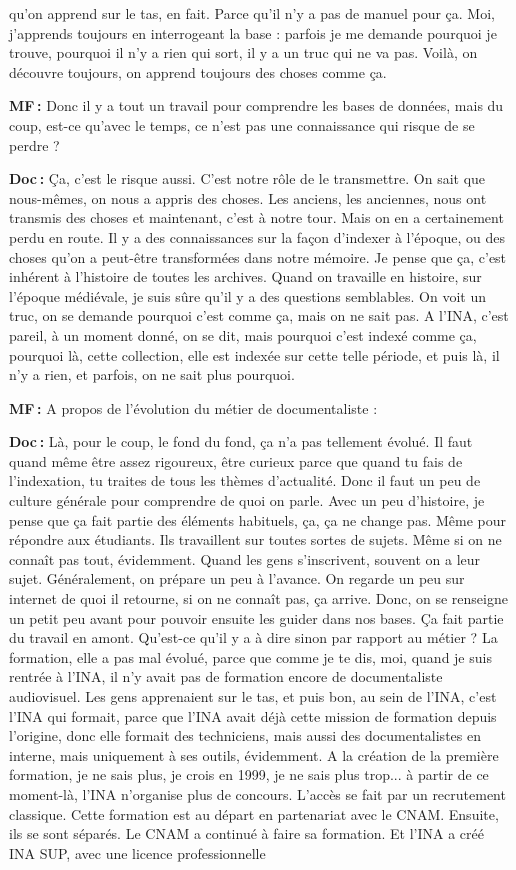 qu'on apprend sur le tas, en fait. Parce qu'il n'y a pas de manuel pour ça. Moi, j'apprends toujours en interrogeant la base : parfois je me demande pourquoi je trouve, pourquoi il n'y a rien qui sort, il y a un truc qui ne va pas. Voilà, on découvre toujours, on apprend toujours des choses comme ça.

\textbf{MF :} Donc il y a tout un travail pour comprendre les bases de données, mais du coup, est-ce qu'avec le temps, ce n'est pas une connaissance qui risque de se perdre ? 

\textbf{Doc :} Ça, c'est le risque aussi. C'est notre rôle de le transmettre. On sait que nous-mêmes, on nous a appris des choses. Les anciens, les anciennes, nous ont transmis des choses et maintenant, c'est à notre tour. Mais on en a certainement perdu en route.  Il y a des connaissances sur la façon d'indexer à l'époque, ou des choses qu'on a peut-être transformées dans notre mémoire. Je pense que ça, c'est inhérent à l'histoire de toutes les archives.  Quand on travaille en histoire, sur l'époque médiévale, je suis sûre qu'il y a des questions semblables. On voit un truc, on se demande pourquoi c'est comme ça, mais on ne sait pas.  A l’INA, c'est pareil, à un moment donné, on se dit, mais pourquoi c'est indexé comme ça, pourquoi là, cette collection, elle est indexée sur cette telle période, et puis là, il n'y a rien, et parfois, on ne sait plus pourquoi.

\textbf{MF :} A propos de l’évolution du métier de documentaliste :

\textbf{Doc :} Là, pour le coup, le fond du fond, ça n'a pas tellement évolué. Il faut quand même être assez rigoureux, être curieux parce que quand tu fais de l'indexation, tu traites de tous les thèmes d'actualité. Donc il faut un peu de culture générale pour comprendre de quoi on parle. Avec un peu d'histoire, je pense que ça fait partie des éléments habituels, ça, ça ne change pas. Même pour répondre aux étudiants. Ils travaillent sur toutes sortes de sujets. Même si on ne connaît pas tout, évidemment. Quand les gens s'inscrivent, souvent on a leur sujet. Généralement, on prépare un peu à l’avance. On regarde un peu sur internet de quoi il retourne, si on ne connaît pas, ça arrive. Donc, on se renseigne un petit peu avant pour pouvoir ensuite les guider dans nos bases. Ça fait partie du travail en amont. Qu'est-ce qu'il y a à dire sinon par rapport au métier ? La formation, elle a pas mal évolué, parce que comme je te dis, moi, quand je suis rentrée à l'INA, il n'y avait pas de formation encore de documentaliste audiovisuel. Les gens apprenaient sur le tas, et puis bon, au sein de l'INA, c'est l'INA qui formait, parce que l'INA avait déjà cette mission de formation depuis l'origine, donc elle formait des techniciens, mais aussi des documentalistes en interne, mais uniquement à ses outils, évidemment. A la création de la première formation, je ne sais plus, je crois en 1999, je ne sais plus trop... à partir de ce moment-là, l’INA n’organise plus de concours.  L'accès se fait par un recrutement classique. Cette formation est au départ en partenariat avec le CNAM. Ensuite, ils se sont séparés. Le CNAM a continué à faire sa formation. Et l'INA a créé INA SUP, avec une licence professionnelle 


